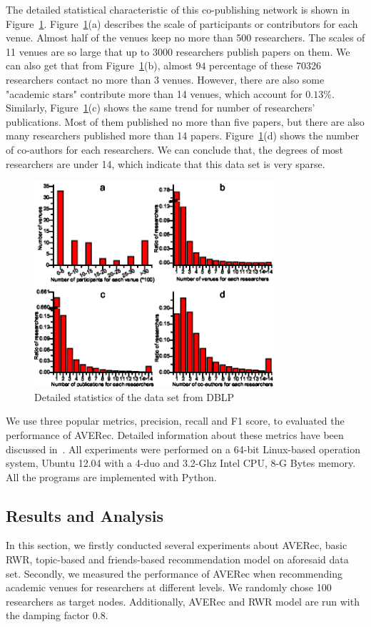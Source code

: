 \documentclass[9pt]{acm_proc_article-sp}
\begin{document}
The detailed statistical characteristic of this co-publishing network is shown in Figure~\ref{fig3}. Figure~\ref{fig3}(a) describes the scale of participants or contributors for each venue. Almost half of the venues keep no more than 500 researchers. The scales of 11 venues are so large that up to 3000 researchers publish papers on them. We can also get that from Figure~\ref{fig3}(b), almost $94$ percentage of these 70326 researchers contact no more than 3 venues. However, there are also some "academic stars" contribute more than 14 venues, which account for $0.13\%$. Similarly, Figure~\ref{fig3}(c) shows the same trend for number of researchers' publications. Most of them published no more than five papers, but there are also many researchers published more than 14 papers. Figure~\ref{fig3}(d) shows the number of co-authors for each researchers. We can conclude that, the degrees of most researchers are under 14, which indicate that this data set is very sparse.

\begin{figure}[!ht]
\centering
\includegraphics [width=3.5in]{Fig3.eps}
\caption{Detailed statistics of the data set from DBLP}
\label{fig3}
\end{figure}

We use three popular metrics, precision, recall and F1 score, to evaluated the performance of AVERec. Detailed information about these metrics have been discussed in~\cite{xia2014mvcwalker}. All experiments were performed on a 64-bit Linux-based operation system, Ubuntu 12.04 with a 4-duo and 3.2-Ghz Intel CPU, 8-G Bytes memory. All the programs are implemented with Python.

\subsection{Results and Analysis}
In this section, we firstly conducted several experiments about AVERec, basic RWR, topic-based and friends-based recommendation model on aforesaid data set. Secondly, we measured the performance of AVERec when recommending academic venues for researchers at different levels. We randomly chose 100 researchers as target nodes. Additionally, AVERec and RWR model are run with the damping factor 0.8.
\end{document}
